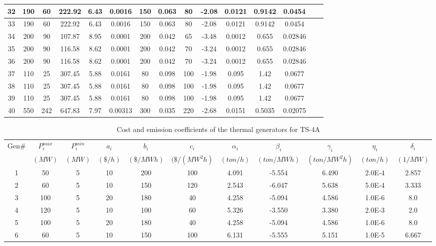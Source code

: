 \begin{table} [tb]
{\begin{tabular}{|c|c|c|c|c|c|c|c|c|c|c|c|c|c|c|}
    \hline
32	&	190	&	60	&	222.92	&	6.43	&	0.0016	&	150	&	0.063	&	80	&	-2.08	&	0.0121	&	0.9142	&	0.0454\\
    \hline
33	&	190	&	60	&	222.92	&	6.43	&	0.0016	&	150	&	0.063	&	80	&	-2.08	&	0.0121	&	0.9142	&	0.0454\\
    \hline
34	&	200	&	90	&	107.87	&	8.95	&	0.0001	&	200	&	0.042	&	65	&	-3.48	&	0.0012	&	0.655	&	0.02846\\
    \hline
35	&	200	&	90	&	116.58	&	8.62	&	0.0001	&	200	&	0.042	&	70	&	-3.24	&	0.0012	&	0.655	&	0.02846\\
    \hline
36	&	200	&	90	&	116.58	&	8.62	&	0.0001	&	200	&	0.042	&	70	&	-3.24	&	0.0012	&	0.655	&	0.02846\\
    \hline
37	&	110	&	25	&	307.45	&	5.88	&	0.0161	&	80	&	0.098	&	100	&	-1.98	&	0.095	&	1.42	&	0.0677\\
    \hline
38	&	110	&	25	&	307.45	&	5.88	&	0.0161	&	80	&	0.098	&	100	&	-1.98	&	0.095	&	1.42	&	0.0677\\
    \hline
39	&	110	&	25	&	307.45	&	5.88	&	0.0161	&	80	&	0.098	&	100	&	-1.98	&	0.095	&	1.42	&	0.0677\\
    \hline
40	&	550	&	242	&	647.83	&	7.97	&	0.00313	&	300	&	0.035	&	220	&	-2.68	&	0.0151	&	0.5035	&	0.02075\\
    \hline
  \end{tabular} 
  } 
\end{table}

\begin{table} [tb]
\caption{Cost and emission coefficients of the thermal generators for TS-4A}
\label{table_CoeffTS4A}
  \centering
  \scalebox{0.7} {
  \begin{tabular}{|c|c|c|c|c|c|c|c|c|c|c|}
    \hline
    Gen\# & $P_i^{max}$ & $P_i^{min}$ & $a_i$ & $b_i$ & $c_i$ & $\alpha_i$ & $\beta_i$ & $\gamma_i$ & $\eta_i$ & $\delta_i$ \\
    
      & $(MW)$ & $(MW)$ & $(\$/h)$ & $(\$/MWh)$ & $(\$/(MW^2h)$ & $(ton/h)$ & $(ton/MWh)$ & $(ton/MW^2h)$ & $(ton/h)$ & $(1/MW)$\\
    \hline
    1 & 50 & 5 & 10 & 200 & 100 & 4.091 & -5.554 & 6.490 & 2.0E-4 & 2.857\\
    \hline
    2 &  60 & 5 & 10 & 150 & 120 & 2.543 & -6.047 & 5.638 & 5.0E-4 & 3.333\\
    \hline
    3 &  100 & 5 & 20 & 180 & 40 & 4.258 & -5.094 & 4.586 & 1.0E-6 & 8.0\\
    \hline
    4 &  120 & 5 & 10 & 100 & 60 & 5.326 & -3.550 & 3.380 & 2.0E-3 & 2.0\\
    \hline
    5 &  100 & 5 & 20 & 180 & 40 & 4.258 & -5.094 & 4.586 & 1.0E-6 & 8.0\\
    \hline
    6 &  60 & 5 & 10 & 150 & 100 & 6.131 & -5.555 & 5.151 & 1.0E-5 & 6.667\\
    \hline
  \end{tabular}
  }
\end{table}

